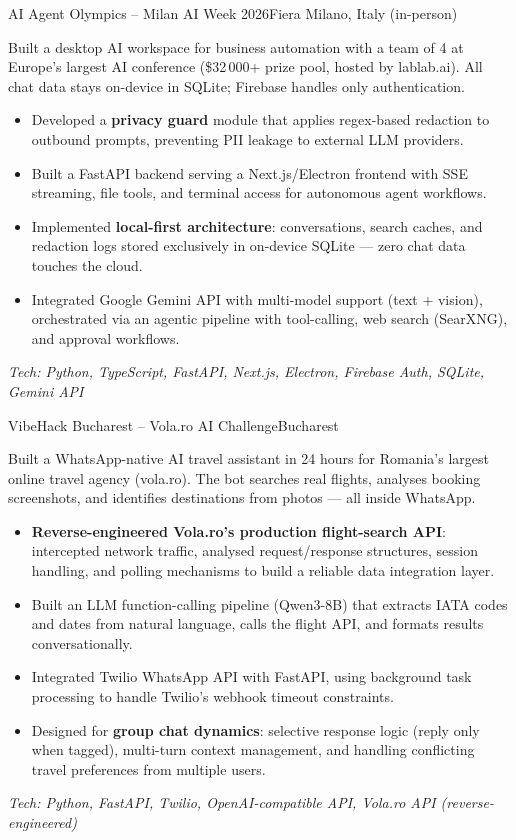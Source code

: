\documentclass[11pt, a4paper]{moderncv}
\begin{document}
%
        {AI Agent Olympics -- Milan AI Week 2026}{Fiera Milano, Italy (in-person)}{}{
  Built a desktop AI workspace for business automation with a team of 4 at Europe's
  largest AI conference (\$32\,000+ prize pool, hosted by lablab.ai).
  All chat data stays on-device in SQLite; Firebase handles only authentication.
  \begin{itemize}
    \item Developed a \textbf{privacy guard} module that applies regex-based redaction to outbound prompts, preventing PII leakage to external LLM providers.
    \item Built a FastAPI backend serving a Next.js/Electron frontend with SSE streaming, file tools, and terminal access for autonomous agent workflows.
    \item Implemented \textbf{local-first architecture}: conversations, search caches, and redaction logs stored exclusively in on-device SQLite --- zero chat data touches the cloud.
    \item Integrated Google Gemini API with multi-model support (text + vision), orchestrated via an agentic pipeline with tool-calling, web search (SearXNG), and approval workflows.
  \end{itemize}
  \small{\textit{Tech: Python, TypeScript, FastAPI, Next.js, Electron, Firebase Auth, SQLite, Gemini API}}
}

%
        {VibeHack Bucharest -- Vola.ro AI Challenge}{Bucharest}{}{
  Built a WhatsApp-native AI travel assistant in 24 hours for Romania's largest
  online travel agency (vola.ro). The bot searches real flights, analyses booking
  screenshots, and identifies destinations from photos --- all inside WhatsApp.
  \begin{itemize}
    \item \textbf{Reverse-engineered Vola.ro's production flight-search API}: intercepted network traffic, analysed request/response structures, session handling, and polling mechanisms to build a reliable data integration layer.
    \item Built an LLM function-calling pipeline (Qwen3-8B) that extracts IATA codes and dates from natural language, calls the flight API, and formats results conversationally.
    \item Integrated Twilio WhatsApp API with FastAPI, using background task processing to handle Twilio's webhook timeout constraints.
    \item Designed for \textbf{group chat dynamics}: selective response logic (reply only when tagged), multi-turn context management, and handling conflicting travel preferences from multiple users.
  \end{itemize}
  \small{\textit{Tech: Python, FastAPI, Twilio, OpenAI-compatible API, Vola.ro API (reverse-engineered)}}
}
\end{document}
